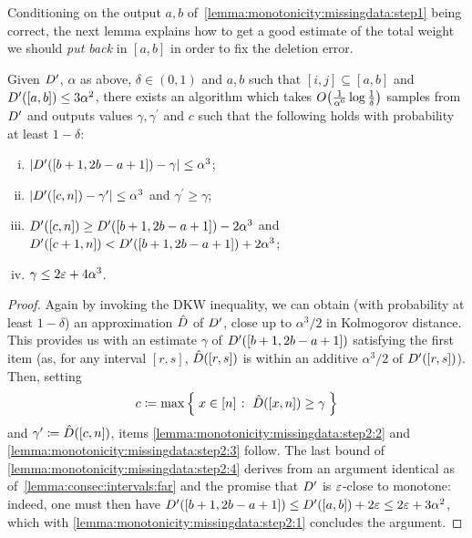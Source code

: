 Conditioning on the output $a,b$ of~\autoref{lemma:monotonicity:missingdata:step1} being correct, the next lemma explains how to get a good estimate of the total weight we should \emph{put back} in $[a,b]$ in order to fix the deletion error.
\begin{lemma}\label{lemma:monotonicity:missingdata:step2}
Given $D^\prime$, $\alpha$ as above, $\delta\in(0,1)$ and $a,b$ such that $[i,j]\subseteq[a,b]$ and $D^\prime([a,b]) \leq 3\alpha^2$, there exists an algorithm which takes $\bigO{\frac{1}{\alpha^6}\log\frac{1}{\delta}}$ samples from $D^\prime$ and outputs values $\gamma, \gamma^\prime$ and $c$ such that the following holds with probability at least $1-\delta$: 
\begin{enumerate}[(i)]
  \item\label{lemma:monotonicity:missingdata:step2:1}
         $\left\lvert  D^\prime([b+1,2b-a+1])-\gamma  \right\rvert \leq \alpha^3$;
  \item\label{lemma:monotonicity:missingdata:step2:2}
         $\left\lvert  D^\prime([c,n])-\gamma^\prime  \right\rvert \leq \alpha^3$ and $\gamma^\prime\geq \gamma$;
  \item\label{lemma:monotonicity:missingdata:step2:3}
         $D^\prime([c,n]) \geq D^\prime([b+1,2b-a+1]) - 2\alpha^3$ and $D^\prime([c+1,n]) < D^\prime([b+1,2b-a+1]) + 2\alpha^3$;
  \item\label{lemma:monotonicity:missingdata:step2:4}
         $\gamma \leq 2\varepsilon+4\alpha^3$.
\end{enumerate}
\end{lemma} 
\begin{proof}
 Again by invoking the DKW inequality, we can obtain (with probability at least $1-\delta$) an approximation $\hat{D}$ of $D^\prime$, close up to $\alpha^3/2$ in Kolmogorov distance. This provides us with an estimate $\gamma$ of $D^\prime([b+1,2b-a+1])$ satisfying the first item (as, for any interval $[r,s]$, $\hat{D}([r,s])$ is within an additive $\alpha^3/2$ of $D^\prime([r,s])$). Then, setting 
 \[
    c \coloneqq \max \left\{\;  x\in[n]  \;\colon\;  \hat{D}([x,n]) \geq \gamma \; \right\}
 \]
 and $\gamma^\prime \coloneqq \hat{D}([c,n])$, items \ref{lemma:monotonicity:missingdata:step2:2} and \ref{lemma:monotonicity:missingdata:step2:3} follow. The last bound of \ref{lemma:monotonicity:missingdata:step2:4} derives from an argument identical as of~\autoref{lemma:consec:intervals:far} and the promise that $D^\prime$ is $\varepsilon$-close to monotone: indeed, one must then have $D^\prime([b+1,2b-a+1]) \leq D^\prime([a,b]) + 2\varepsilon \leq 2\varepsilon + 3\alpha^2$, which with \ref{lemma:monotonicity:missingdata:step2:1} concludes the argument.
\end{proof} 


